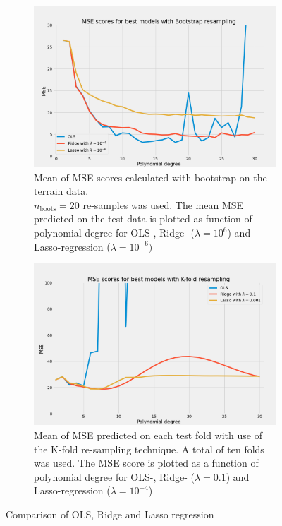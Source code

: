 \begin{figure}[H]
    \centering
    \begin{subfigure}[t]{0.49\textwidth}
        \includegraphics[width=\textwidth]{Figures/terrain_best_ols_ridge_lasso_boots.png}
        \caption{Mean of MSE scores calculated with bootstrap on the terrain data.\\ $n_{\text{boots}} =
        20$ re-samples was used. The mean MSE predicted on the test-data is plotted as
    function of polynomial degree for OLS-, Ridge- ($\lambda = 10^{6}$) and
Lasso-regression ($\lambda = 10^{-6})$   }  
    \end{subfigure}
    \begin{subfigure}[t]{0.49\textwidth}
        \includegraphics[width=\textwidth]{Figures/terrain_best_ols_ridge_lasso_kfold.png}
        \caption{Mean of MSE predicted on each test fold with use of the K-fold
        re-sampling technique. A total of ten folds was used. The MSE score is plotted as a function
    of polynomial degree for OLS-, Ridge- ($\lambda = 0.1$) and Lasso-regression
($\lambda = 10^{-4}$)}  
    \end{subfigure}

    \caption{Comparison of OLS, Ridge and Lasso regression}  
    \label{fig:terrain_ols_vs_ridge_vs_lasso} 
\end{figure}

